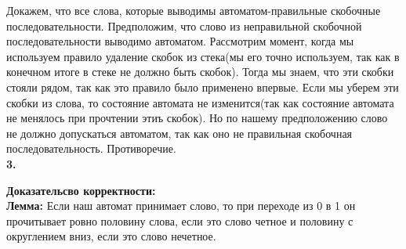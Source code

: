 \documentclass[a4paper,12pt]{article}
\begin{document}
Докажем, что все слова, которые выводимы автоматом-правильные скобочные последовательности. Предположим, что слово из неправильной скобочной последовательности выводимо автоматом. Рассмотрим момент, когда мы используем правило удаление скобок из стека(мы его точно используем, так как в конечном итоге в стеке не должно быть скобок). Тогда мы знаем, что эти скобки стояли рядом, так как это правило было применено впервые. Если мы уберем эти скобки из слова, то состояние автомата не изменится(так как состояние автомата не менялось при прочтении этиъ скобок). Но по нашему предположению слово не должно допускаться автоматом, так как оно не правильная скобочная последовательность. Противоречие.\\
\textbf{3.}\\


\begin{center} 
\end{center}
\textbf{Доказательсво корректности:}\\
\textbf{Лемма:} Если наш автомат принимает слово, то при переходе из 0 в 1 он прочитывает ровно половину слова, если это слово четное и половину с округлением вниз, если это слово нечетное. \\
\end{document}
